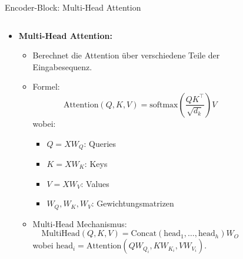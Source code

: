 \documentclass[aspectratio=1610, xcolor=dvipsnames, 9pt]{beamer}
\begin{document}
\begin{frame}{Encoder-Block: Multi-Head Attention}
  \begin{columns}
    \begin{column}{0.7\textwidth}
      \begin{itemize}
        \item \textbf{Multi-Head Attention:}
          \begin{itemize}
            \item Berechnet die Attention über verschiedene Teile der Eingabesequenz.
            \item Formel:
              \[
              \text{Attention}(Q, K, V) = \text{softmax}\left(\frac{QK^\top}{\sqrt{d_k}}\right)V
              \]
              wobei:
              \begin{itemize}
                \item \( Q = XW_Q \): Queries
                \item \( K = XW_K \): Keys
                \item \( V = XW_V \): Values
                \item \( W_Q, W_K, W_V \): Gewichtungsmatrizen
              \end{itemize}
            \item Multi-Head Mechanismus:
              \[
              \text{MultiHead}(Q, K, V) = \text{Concat}(\text{head}_1, \dots, \text{head}_h)W_O
              \]
              wobei \( \text{head}_i = \text{Attention}(QW_{Q_i}, KW_{K_i}, VW_{V_i}) \).
          \end{itemize}
      \end{itemize}
    \end{column}
    \begin{column}{0.3\textwidth}
      \begin{figure}
        \centering

\end{figure}
\end{column}
\end{columns}
\end{frame}
\end{document}
